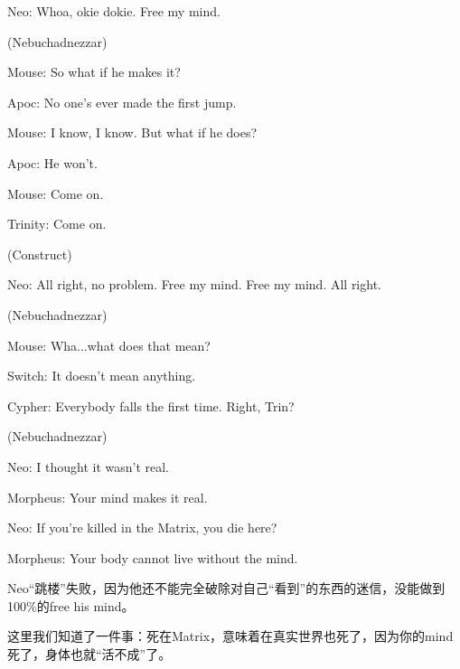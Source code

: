 \documentclass{ctexart}
\newenvironment{myquote}{\color{green} \setlength{\leftskip}{6em} \setlength{\rightskip}{4em} \setlength{\parindent}{-2em}}{\par}
\begin{document}
\begin{myquote}
Neo: Whoa, okie dokie. Free my mind.

(Nebuchadnezzar)

Mouse: So what if he makes it?

Apoc: No one's ever made the first jump.

Mouse: I know, I know. But what if he does?

Apoc: He won't.

Mouse: Come on.

Trinity: Come on.

(Construct)

Neo: All right, no problem. Free my mind. Free my mind. All right.

(Nebuchadnezzar)

Mouse: Wha...what does that mean?

Switch: It doesn't mean anything.

Cypher: Everybody falls the first time. Right, Trin?

(Nebuchadnezzar)

Neo: I thought it wasn't real.

Morpheus: Your mind makes it real.

Neo: If you're killed in the Matrix, you die here?

Morpheus: Your body cannot live without the mind.
\end{myquote}

Neo“跳楼”失败，因为他还不能完全破除对自己“看到”的东西的迷信，没能做到100\%的free his mind。

这里我们知道了一件事：死在Matrix，意味着在真实世界也死了，因为你的mind死了，身体也就“活不成”了。
\end{document}
